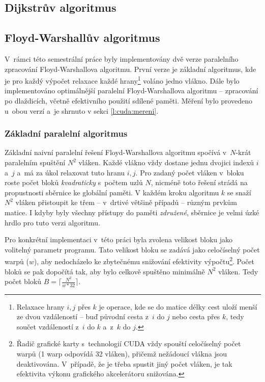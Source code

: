 \subsection{Dijkstrův algoritmus}

\subsection{Floyd-Warshallův algoritmus}
V~rámci této semestrální práce byly implementovány dvě verze paralelního zpracování Floyd-Warshallova algoritmu. 
První verze je základní algoritmus, kde je pro každý výpočet relaxace každé hrany\footnote{Relaxace hrany $i,j$ přes $k$ je operace, 
kde se do matice délky cest uloží menší ze dvou vzdáleností -- buď původní cesta z~$i$ do $j$ nebo cesta
přes $k$, tedy součet vzdáleností z~$i$ do $k$ a~z~$k$ do $j$.} voláno jedno vlákno. Dále bylo implementováno 
optimálnější paralelní Floyd-Warshallova algoritmu -- zpracování po dlaždicích, včetně efektivního použití sdílené paměti.
Měření bylo provedeno u~obou verzí a~je shrnuto v sekci \ref{l:cuda:mereni}.

\subsubsection{Základní paralelní algoritmus}
Základní naivní paralelní řešení Floyd-Warshallova algoritmu spočívá v~$N$-krát paralelním spuštění $N^2$ vláken. 
Každé vlákno vždy dostane jednu dvojici indexů $i$ a~$j$ a~má za úkol relaxovat tuto hranu $i,j$. Pro zadaný počet vláken
v~bloku roste počet bloků \emph{kvadraticky} s~počtem uzlů $N$, nicméně toto řešení strádá na propustnosti sběrnice
ke globální paměti. V každém kroku algoritmu $k$ se snaží $N^2$ vláken přistoupit ke třem -- v~drtivé většině případů -- 
různým prvkům matice. I kdyby byly všechny přístupy do paměti \emph{združené}, sběrnice je velmi úzké hrdlo pro tuto verzi
algoritmu.


Pro konkrétní implementaci v~této práci byla zvolena velikost bloku jako volitelný parametr programu. Tato velikost bloku se zadává
jako celočíselný počet warpů ($w$), aby nedocházelo ke zbytečnému snižování efektivity výpočtu\footnote{Řadič grafické karty 
s~technologií CUDA vždy spouští celočíselný počet warpů (1 warp odpovídá 32 vláken), přičemž nežádoucí vlákna jsou deaktivována.
V~případě, že je třeba spustit jiný počet vláken, je tak efektivita výkonu grafického akcelerátoru snižována.}.
Počet bloků se pak dopočítá tak, aby bylo celkově spuštěno minimálně $N^2$ vláken. Tedy počet bloků $B = \lceil \frac{N^2}{w*32} \rceil$.

